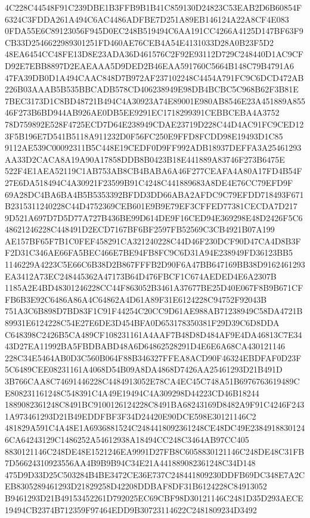 \documentclass[UTF8,fontset=fandol,zihao=-4,a4paper]{ctexart}
\begin{document}
{{4C228C44548F91C239DBE1B3FFB9B1B41C859130D24823C53EAB2D6B60854F6324C3FDDA261A494C6AC4486ADFBE7D251A89EB146124A22A8CF4E083
0FDA55E6C89123056F945D0EC248B519494C6AA191CC4266A4125D147BF63F9CB33D2546622989301251FD460AE76CEB4A54E4131033D28A0B23F5D2
48EA6454CC48FE13D8E23ADA36D461576C2F92E93112D729C248440D1AC9CFD92E7EBB8897D2EAEAAA5D9DED2B46EAA591760C5664B148C79B4791A6
47FA39DB0D1A494CAAC848D7B972AF237102248C4454A791FC9C6DCD472AB226B03AAAB5B535BBCADB578CD406238949E98DB4BCBC5C968B62F3B81E
7BEC3173D1C8BD48721B494C4A30923A74E89001E980AB8546E23A451889A85546F273B6BD944AB926AE0DB5EE9291EC1718299391CEBBCEBA4A3752
78D759892E528F4725ECD7D64E238949CDAE23719D228C44D4AC91FC9CED123F5B196E7D541B5118A911232D0F56FC250E9FFD8FCDD98E19493D1C85
9112AE539C00092311B5C448E19CEDF0D9FF992ADB18937DEFFA3A25461293AA33D2CACA8A19A90A17858DDB8B0423B18E441889A83746F273B6475E
522F4E1AEA52119C1AB753AB8CB4BABA6A46F277CEAFA4A80A17FD4B54F27E6DA518494C4A30921F23599B91C4248C441889683A8DE4E76CC79EFD9F
69A28DC4BA6BA4B5B5353392BFDD3DD66ABA2AFDC9C79EFDD718493F671B2315311240228C44D4752369CEB601E9B9E79EF3CFFED77381CECDA7D217
9D521A697D7D5D77A727B436BE99D614DE9F16CED94E369298E48D2426F5C648621246228C448491D2ECD7167BF6BF2597FB52569C3CB4921B07A199
AE157BF65F7B1C0FEF458291CA321240228C44D46F230DCF90D47CA4D8B3FF2D31C346AE66FA5BEC466E7BE94FB8FC9C6D31A94E238949FD36123BB5
1146229A4223C5E66C6B38D2B867FFFB2D90F6A47BB647169BB38D9162461293EA3412A73EC248445362A47173B64D476FBCF1C674AEDED4E6A2307B
1185A2E4BD48301246228CC44F863052B3461A37677BE25D40E067F8B9B671CFFB6B3E92C6486A86A4C64862A4D61A89F31E6124228C94752F92043B
751A3C6B898D7BD83F1C91F44254C20CC9D61AE988AB71238949C58DA4721B89931E6124228C54E27E6DE3D454BFA0D653178350381F29D39C6D8DDA
C648398C2426B5CA489CF108231161A4AAF7B48D8D484AF9E4DA46813C7E3443D27EA11992BA5FBDBABD48A6D64862528291D4E6E6A68CA430121146
228C34E5464AB0D3C560B064F88B346327FFEA8ACD90F46324EBDFAF0D23F5C6489CEE08231161A4068D54B09A8DA4868D7426AA25461293D21B491D
3B766CAA8C74691446228C4484913052E78CA4EC45C748A51B6976763619489CE808231161248C548391C4A49E19494C4A309298D44223CD46B18244
1889082361248C8491BC9100126124228C8491BA68243169D8482A9F91C4246F2431A973461293D21B49EDDFBF3F34D24420E90DCE598E30121146C2
481829A591C4A48E1A6936881524C2484418092361248CE48DC49E23849188301246CA64243129C1486252A54612938A18494CC248C3464AB97CC405
8830121146C248DE48E1521246EA9991D27FB8C6058830121146C248DE48C31FB7D56624310923556AA4B9B9B94C34E21A441889082361248C34D148
475D9D33D25C503284B4BE3472CE36E737C248441809230DDFB69DC348E7A2CEB8305289461293D21829258D42208DDBAF8DF31B6124228C84913052
B9461293D21B49153452261D792025EC69CBF98D30121146C2481D35D293AECE19494CB2374B712359F97464EDD9B30723114622C2481809234D3492
}}
\end{document}
